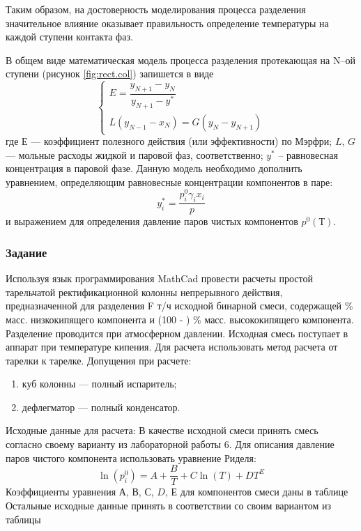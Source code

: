 Таким образом, на достоверность моделирования процесса разделения значительное влияние оказывает правильность определение температуры на каждой ступени контакта фаз.

В общем виде математическая модель процесса разделения протекающая на N--ой ступени (рисунок \ref{fig:rect.col}) запишется в виде
\begin{equation}
\left\lbrace 
\begin{gathered} 
E=\dfrac{y_{N+1}-y_{N}}{y_{N+1}-y^*}\\
L(y_{N-1}-x_N)=G(y_N-y_{N+1})
\end{gathered} 
\right.
\end{equation}
где $Е$ --- коэффициент полезного действия (или эффективности) по Мэрфри; $L$, $G$ --- мольные расходы жидкой и паровой фаз, соответственно; $y^*$ – равновесная концентрация в паровой фазе. Данную модель необходимо дополнить уравнением, определяющим равновесные концентрации компонентов в паре:
\begin{equation}
	y_i^*=\dfrac{p_i^0 \gamma_i x_i}{p}
\end{equation}
и выражением для определения давление паров чистых компонентов $p^0(Т)$.

\subsubsection{Задание}
Используя язык программирования MathCad провести расчеты простой тарельчатой ректификационной колонны непрерывного действия, предназначенной для разделения F т/ч исходной бинарной смеси, содержащей  \% масс. низкокипящего компонента и (100 - ) \% масс. высококипящего компонента. Разделение проводится при атмосферном давлении. Исходная смесь поступает в аппарат при температуре кипения.
Для расчета использовать метод расчета от тарелки к тарелке. Допущения при расчете:
\begin{enumerate}
\item куб колонны --- полный испаритель;
\item дефлегматор --- полный конденсатор.
\end{enumerate}

Исходные данные для расчета:
В качестве исходной смеси принять смесь согласно своему варианту из лабораторной работы 6. Для описания давление паров чистого компонента использовать уравнение Риделя:
\begin{equation}
	\ln (p_i^0)= A + \dfrac{B}{T}  + C \ln(T) + D T^E
\end{equation}
Коэффициенты уравнения $А$, $В$, $С$, $D$, $Е$ для компонентов смеси даны в таблице \ %
Остальные исходные данные принять в соответствии со своим вариантом из таблицы %

